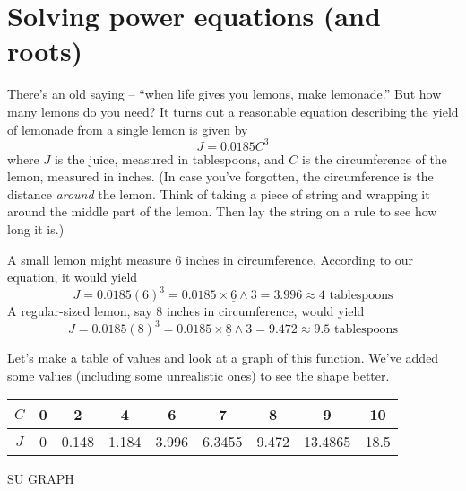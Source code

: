 \section{Solving power equations (and roots)}



There's an old saying -- ``when life gives you lemons, make lemonade.''  But how many lemons do you need? It turns out a reasonable equation describing the yield of lemonade from a single lemon is given by $$J = 0.0185C^3$$ where $J$ is the juice, measured in tablespoons, and $C$ is the circumference of the lemon, measured in inches.  (In case you've forgotten, the circumference is the distance \emph{around} the lemon. Think of taking a piece of string and wrapping it around the middle part of the lemon. Then lay the string on a rule to see how long it is.)

A small lemon might measure 6 inches in circumference.  According to our equation, it would yield $$J = 0.0185 (6)^3 = 0.0185 \times \underline{6} \wedge 3 = 3.996 \approx 4\text{ tablespoons}$$ A regular-sized lemon, say 8 inches in circumference, would yield $$J = 0.0185 (8)^3 = 0.0185 \times \underline{8} \wedge 3 = 9.472 \approx 9.5\text{ tablespoons}$$ %


Let's make a table of values and look at a graph of this function.  We've added some values (including some unrealistic ones) to see the shape better.
\begin{center}
\begin{tabular} {|c |c |c |c |c |c |c |c |c|}\hline
$C$ & 0 & 2 & 4 & 6 & 7 & 8 & 9 & 10 \\ \hline
$J$ & 0 & 0.148 & 1.184 & 3.996 & 6.3455 & 9.472 & 13.4865 & 18.5 \\ \hline
\end{tabular}
\end{center}

SU GRAPH

\vspace{2in}

